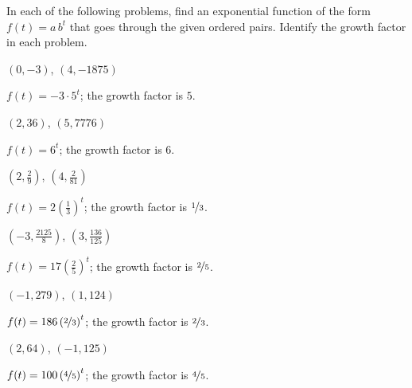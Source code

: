 \begin{exercises}
\begin{problem}
In each of the following problems, find an exponential function of the form $f(t)=a\,b^t$ that goes through the given ordered pairs. Identify the growth factor in each problem.
\begin{multicols}{2}
	\begin{subproblem}
		$(0,-3)$, $(4,-1875)$
		\begin{shortsolution}
			$f(t)=-3\cdot 5^t$; the growth factor is $5$.
		\end{shortsolution}
	\end{subproblem}
	\begin{subproblem}
		$(2,36)$, $(5,7776)$
		\begin{shortsolution}
			$f(t)=6^t$; the growth factor is $6$.
		\end{shortsolution}
	\end{subproblem}
	\begin{subproblem}
		$\left(2,\frac{2}{9}\right)$, $\left(4,\frac{2}{81}\right)$
		\begin{shortsolution}
			$f(t)=2\left(\frac{1}{3}\right)^t$; the growth factor is $\nicefrac{1}{3}$.
		\end{shortsolution}
	\end{subproblem}
	\begin{subproblem}
		$\left(-3,\frac{2125}{8}\right)$, $\left(3,\frac{136}{125}\right)$
		\begin{shortsolution}
			$f(t)=17\left(\frac{2}{5}\right)^t$; the growth factor is $\nicefrac{2}{5}$.
		\end{shortsolution}
	\end{subproblem}
	\begin{subproblem}
		$(-1,279)$, $(1,124)$
		\begin{shortsolution}
			$f(t)=186\left( \nicefrac{2}{3} \right)^t$; the growth factor is $\nicefrac{2}{3}$.
		\end{shortsolution}
	\end{subproblem}
	\begin{subproblem}
		$(2,64)$, $(-1,125)$
		\begin{shortsolution}
			$f(t)=100\left( \nicefrac{4}{5} \right)^t$; the growth factor is $\nicefrac{4}{5}$.
		\end{shortsolution}
	\end{subproblem}
\end{multicols}
\end{problem}
			

\end{exercises}
